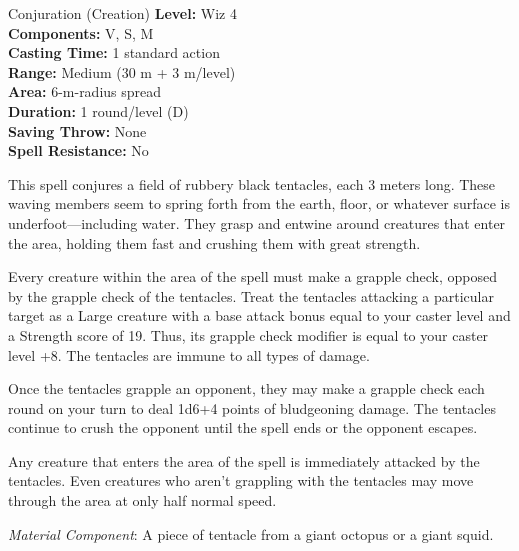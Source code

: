{Conjuration (Creation)}
{
	\textbf{Level:}
	Wiz 4\\
	\textbf{Components:}
	V, S, M\\
	\textbf{Casting Time:}
	1 standard action\\
	\textbf{Range:}
	Medium (30 m + 3 m/level)\\
	\textbf{Area:}
	6-m-radius spread\\
	\textbf{Duration:}
	1 round/level (D)\\
	\textbf{Saving Throw:}
	None\\
	\textbf{Spell Resistance:}
	No\\
}
{
	This spell conjures a field of rubbery black tentacles, each 3 meters long. These waving members seem to spring forth from the earth, floor, or whatever surface is underfoot---including water. They grasp and entwine around creatures that enter the area, holding them fast and crushing them with great strength.

	Every creature within the area of the spell must make a grapple check, opposed by the grapple check of the tentacles. Treat the tentacles attacking a particular target as a Large creature with a base attack bonus equal to your caster level and a Strength score of 19. Thus, its grapple check modifier is equal to your caster level +8. The tentacles are immune to all types of damage.

	Once the tentacles grapple an opponent, they may make a grapple check each round on your turn to deal 1d6+4 points of bludgeoning damage. The tentacles continue to crush the opponent until the spell ends or the opponent escapes.

	Any creature that enters the area of the spell is immediately attacked by the tentacles. Even creatures who aren't grappling with the tentacles may move through the area at only half normal speed.

	\textit{Material Component}:
	A piece of tentacle from a giant octopus or a giant squid.

}
